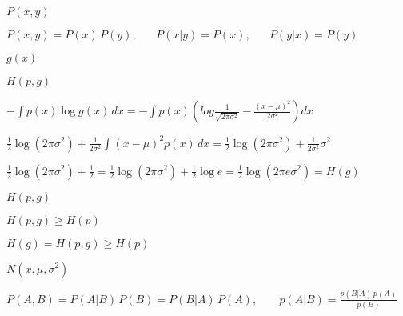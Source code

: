 \documentclass{article}
\def\lthtmlcheckvsize{\ifdim\ht\sizebox<\vsize 
  \ifdim\wd\sizebox<\hsize\expandafter\hfill\fi \expandafter\vfill
  \else\expandafter\vss\fi}%
\begin{document}
{\newpage\clearpage
{}%
$ P(x,y)$%
\lthtmlindisplaymathZ
\lthtmlcheckvsize\clearpage}

{\newpage\clearpage
{}%
$\displaystyle P(x,y)=P(x)\,P(y),\;\;\;\;\;\;P(x|y)=P(x),\;\;\;\;\;\;P(y|x)=P(y)$%
\lthtmlindisplaymathZ
\lthtmlcheckvsize\clearpage}

{\newpage\clearpage
{}%
$ g(x)$%
\lthtmlindisplaymathZ
\lthtmlcheckvsize\clearpage}

{\newpage\clearpage
{}%
$\displaystyle H(p,g)$%
\lthtmlindisplaymathZ
\lthtmlcheckvsize\clearpage}

{\newpage\clearpage
{}%
$\displaystyle -\int p(x)\log g(x)\,dx
=-\int p(x)\left(log\frac{1}{\sqrt{2\pi\sigma^2}}-\frac{(x-\mu)^2}{2\sigma^2}\right)dx$%
\lthtmlindisplaymathZ
\lthtmlcheckvsize\clearpage}

{\newpage\clearpage
{}%
$\displaystyle \frac{1}{2}\log(2\pi\sigma^2)+\frac{1}{2\sigma^2}\int(x-\mu)^2 p(x)\,dx
=\frac{1}{2}\log(2\pi\sigma^2)+\frac{1}{2\sigma^2}\sigma^2$%
\lthtmlindisplaymathZ
\lthtmlcheckvsize\clearpage}

{\newpage\clearpage
{}%
$\displaystyle \frac{1}{2}\log(2\pi\sigma^2)+\frac{1}{2}
=\frac{1}{2}\log(2\pi\sigma^2)+\frac{1}{2}\log e
=\frac{1}{2}\log(2\pi e\sigma^2)=H(g)$%
\lthtmlindisplaymathZ
\lthtmlcheckvsize\clearpage}

{\newpage\clearpage
{}%
$ H(p,g)$%
\lthtmlindisplaymathZ
\lthtmlcheckvsize\clearpage}

{\newpage\clearpage
{}%
$ H(p,g)\ge H(p)$%
\lthtmlindisplaymathZ
\lthtmlcheckvsize\clearpage}

{\newpage\clearpage
{}%
$ H(g)=H(p,g)\ge H(p)$%
\lthtmlindisplaymathZ
\lthtmlcheckvsize\clearpage}

{\newpage\clearpage
{}%
$ N(x,\mu,\sigma^2)$%
\lthtmlindisplaymathZ
\lthtmlcheckvsize\clearpage}

{\newpage\clearpage
{}%
$\displaystyle P(A,B)=P(A|B)\,P(B)=P(B|A)\,P(A),\;\;\;\;\;\;\;
p(A|B)=\frac{p(B|A)\,p(A)}{p(B)}$%
\lthtmlindisplaymathZ
\lthtmlcheckvsize\clearpage}
\end{document}
